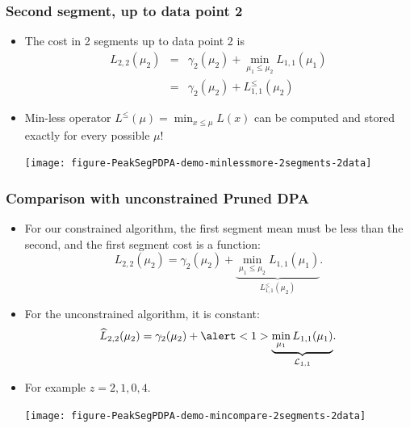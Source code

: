 \documentclass{beamer}
\begin{document}
\begin{frame}[fragile]
  \frametitle{Second segment, up to data point 2}
  \begin{itemize}
  \item The cost in 2 segments up to data point 2 is
\begin{eqnarray*}
  L_{2,2}(\mu_2) 
  &=&  \gamma_2(\mu_2)+\min_{\mu_1 \leq \mu_2} L_{1,1}(\mu_1)\\
  &=& \gamma_2(\mu_2)+L_{1,1}^{\leq}(\mu_2)
\end{eqnarray*}
\item Min-less operator $L^\leq(\mu) = \min_{x\leq\mu} L(x)$ can be
  computed and stored exactly for every possible $\mu$!
    \begin{center}
      \texttt{[image: figure-PeakSegPDPA-demo-minlessmore-2segments-2data]}
    \end{center}
\end{itemize}
\end{frame}

\begin{frame}
  \frametitle{Comparison with unconstrained Pruned DPA}
  \begin{itemize}
  \item For our constrained algorithm, the first segment mean must be
    less than the second, and the first segment cost is a function:
    \begin{equation*}
      L_{2,2}(\mu_2) = \gamma_2(\mu_2)+
      \underbrace{\min_{\mu_1 \leq \mu_2} L_{1,1}(\mu_1)}_{L^\leq_{1,1}(\mu_2)}.
    \end{equation*}
  \item For the unconstrained algorithm, it is \alert<1>{constant}:
    \begin{equation*}
      \widehat{L}_{2,2}(\mu_2) = \gamma_2(\mu_2)+
      \alert<1>{\underbrace{\min_{\mu_1} L_{1,1}(\mu_1)}_{\mathcal L_{1,1}}}.
    \end{equation*}
  \item For example $z = 2, 1, 0, 4$.
    \begin{center}
      \texttt{[image: figure-PeakSegPDPA-demo-mincompare-2segments-2data]}
    \end{center}
  \end{itemize}
\end{frame}
\end{document}
